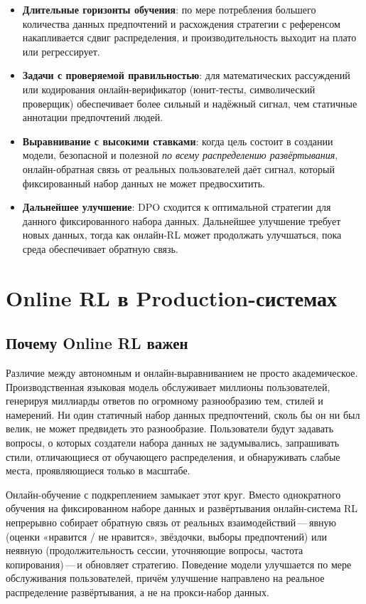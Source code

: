 \begin{itemize}[leftmargin=*]
  \item \textbf{Длительные горизонты обучения}: по мере потребления большего количества данных предпочтений и расхождения стратегии с референсом накапливается сдвиг распределения, и производительность выходит на плато или регрессирует.
  \item \textbf{Задачи с проверяемой правильностью}: для математических рассуждений или кодирования онлайн-верификатор (юнит-тесты, символический проверщик) обеспечивает более сильный и надёжный сигнал, чем статичные аннотации предпочтений людей.
  \item \textbf{Выравнивание с высокими ставками}: когда цель состоит в создании модели, безопасной и полезной \emph{по всему распределению развёртывания}, онлайн-обратная связь от реальных пользователей даёт сигнал, который фиксированный набор данных не может предвосхитить.
  \item \textbf{Дальнейшее улучшение}: DPO сходится к оптимальной стратегии для данного фиксированного набора данных. Дальнейшее улучшение требует новых данных, тогда как онлайн-RL может продолжать улучшаться, пока среда обеспечивает обратную связь.
\end{itemize}

\section{Online RL в Production-системах}
\label{sec:online-rl-production}

\subsection{Почему Online RL важен}

Различие между автономным и онлайн-выравниванием не просто академическое. Производственная языковая модель обслуживает миллионы пользователей, генерируя миллиарды ответов по огромному разнообразию тем, стилей и намерений. Ни один статичный набор данных предпочтений, сколь бы он ни был велик, не может предвидеть это разнообразие. Пользователи будут задавать вопросы, о которых создатели набора данных не задумывались, запрашивать стили, отличающиеся от обучающего распределения, и обнаруживать слабые места, проявляющиеся только в масштабе.

Онлайн-обучение с подкреплением замыкает этот круг. Вместо однократного обучения на фиксированном наборе данных и развёртывания онлайн-система RL непрерывно собирает обратную связь от реальных взаимодействий\,---\,явную (оценки «нравится / не нравится», звёздочки, выборы предпочтений) или неявную (продолжительность сессии, уточняющие вопросы, частота копирования)\,---\,и обновляет стратегию. Поведение модели улучшается по мере обслуживания пользователей, причём улучшение направлено на реальное распределение развёртывания, а не на прокси-набор данных.

